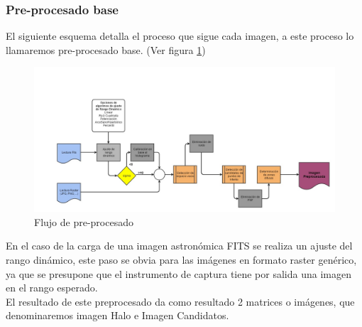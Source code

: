 	\subsubsection{Pre-procesado base}
	El siguiente esquema detalla el proceso que sigue cada imagen, a este proceso lo llamaremos pre-procesado base. (Ver figura \ref{fig:esquemaPreprocesado})\\
	\begin{figure}[!htb]
		\centering
		\includegraphics[width=1\textwidth]{images/tfg2016pipeline1.jpg}
		\caption{\label{fig:esquemaPreprocesado}Flujo de pre-procesado}
	\end{figure}
	En el caso de la carga de una imagen astronómica FITS se realiza un ajuste del rango dinámico, este paso se obvia para las imágenes en formato raster genérico, ya que se presupone que el instrumento de captura tiene por salida una imagen en el rango esperado.\\
	El resultado de este preprocesado da como resultado 2 matrices o imágenes, que denominaremos imagen Halo e Imagen Candidatos.
